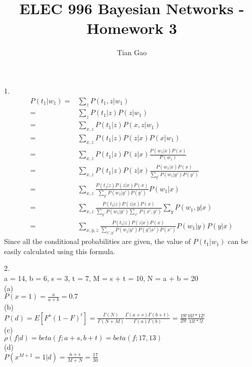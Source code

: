 \documentclass[a4paper]{article}
\title{ELEC 996 Bayesian Networks - Homework 3}
\author{Tian Gao}
\begin{document}
\maketitle

1. \\
\begin{align}
P(t_1|w_1) =& \sum\limits_{z}P(t_1, z|w_1) \\
	=& \sum\limits_{z} P(t_1|z)P(z|w_1) \\
    =& \sum\limits_{x, z} P(t_1|z)P(x,z|w_1) \\
	=& \sum\limits_{x,z} P(t_1|z)P(z|x)P(x|w_1) \\
    =& \sum\limits_{x,z} P(t_1|z)P(z|x) \frac{P(w_1|x)P(x)}{P(w_1)} \\
    =& \sum\limits_{x,z} P(t_1|z)P(z|x) \frac{P(w_1|x)P(x)}{\sum\limits_{y'}P(w_1|y')P(y')} \\
    =& \sum\limits_{x,z}  \frac{P(t_1|z)P(z|x)P(x)}{\sum\limits_{y'}P(w_1|y')P(y')} P(w_1|x)\\
    =& \sum\limits_{x,z}  \frac{P(t_1|z)P(z|x)P(x)}{\sum\limits_{y'}P(w_1|y')\sum\limits_{x'}P(x',y')} \sum\limits_{y}P(w_1,y|x)\\
    =& \sum\limits_{x,y,z}  \frac{P(t_1|z)P(z|x)P(x)}{\sum\limits_{x',y'}P(w_1|y')P(y'|x')P(x')}P(w_1|y)P(y|x)
\end{align}
Since all the conditional	probabilities are given, the value of $P(t_1|w_1)$ can be easily calculated using this formula.

2. \\
a = 14, b = 6, s = 3, t = 7, M = s + t = 10, N = a + b = 20\\
(a)\\
$P(x=1)=\frac{a}{a+b}=0.7$ \\
(b)\\
$P(d)=E[F^s(1-F)^t]=\frac{\Gamma(N)}{\Gamma(N + M)} \frac{\Gamma(a+s)\Gamma(b+t)}{\Gamma(a)\Gamma(b)}
	=\frac{19!}{29!} \frac{16!*12!}{13!*5!}$\\
(c)\\
$\rho(f|d)=beta(f; a+s, b+t)=beta(f;17,13)$\\
(d)\\
$P(x^{M+1}=1|d)=\frac{a+s}{M+N}=\frac{17}{30}$\\
\end{document}
